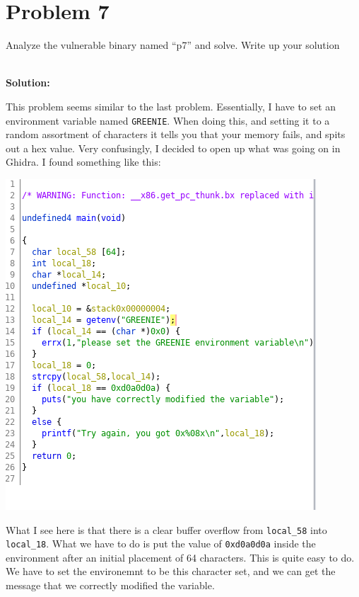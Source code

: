 \documentclass[12pt]{article}
\newcommand\tab[1][0.5cm]{\hspace*{#1}}
\begin{document}

\section{Problem 7}
\tab Analyze the vulnerable binary named “p7” and solve. Write up your solution

\textbf{\\Solution:}

This problem seems similar to the last problem. Essentially, I have to set an environment variable named \texttt{GREENIE}. When doing this, and setting it to a random assortment of characters it tells you that your memory fails, and spits out a hex value. Very confusingly, I decided to open up what was going on in Ghidra. I found something like this:
\begin{center}
	\includegraphics[scale=.7]{Photos/p7pic1.png}
\end{center}

What I see here is that there is a clear buffer overflow from \texttt{local\_58} into \texttt{local\_18}. What we have to do is put the value of \texttt{0xd0a0d0a} inside the environment after an initial placement of 64 characters. This is quite easy to do. We have to set the environemnt to be this character set, and we can get the message that we correctly modified the variable. 
\end{document}
